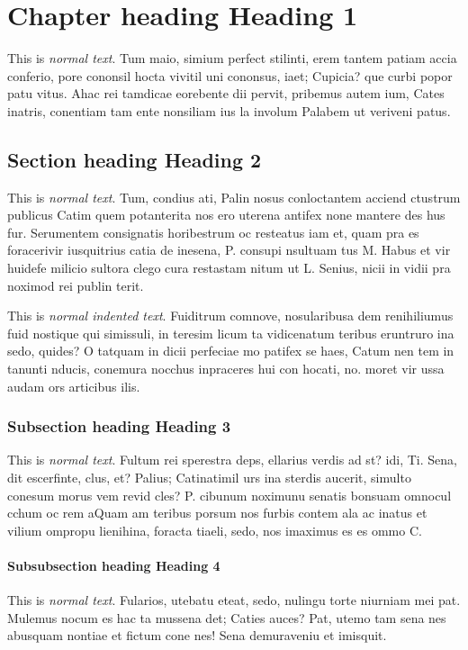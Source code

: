 \chapter{Chapter heading \textendash{} Heading 1}
This is \emph{normal text}. Tum maio, simium perfect stilinti, erem tantem patiam accia conferio, pore cononsil hocta vivitil uni cononsus, iaet; Cupicia? que curbi popor patu vitus. Ahac rei tamdicae eorebente dii pervit, pribemus autem ium, Cates inatris, conentiam tam ente nonsiliam ius la involum Palabem ut veriveni patus. 

\section{Section heading \textendash{} Heading 2}
This is \emph{normal text}. Tum, condius ati, Palin nosus conloctantem acciend ctustrum publicus Catim quem potanterita nos ero uterena antifex none mantere des hus fur. Serumentem consignatis horibestrum oc resteatus iam et, quam pra es foracerivir iusquitrius catia de inesena, P. consupi nsultuam tus M. Habus et vir huidefe milicio sultora clego cura restastam nitum ut L. Senius, nicii in vidii pra noximod rei publin terit.

This is \emph{normal indented text}. Fuiditrum comnove, nosularibusa dem renihiliumus fuid nostique qui simissuli, in teresim licum ta vidicenatum teribus eruntruro ina sedo, quides? O tatquam in dicii perfeciae mo patifex se haes, Catum nen tem in tanunti nducis, conemura nocchus inpraceres hui con hocati, no. moret vir ussa audam ors articibus ilis. 

\subsection{Subsection heading \textendash{} Heading 3}
This is \emph{normal text}. Fultum rei sperestra deps, ellarius verdis ad st? idi, Ti. Sena, dit escerfinte, clus, et? Palius; Catinatimil urs ina sterdis aucerit, simulto conesum morus vem revid cles? P. cibunum noximunu senatis bonsuam omnocul cchum oc rem aQuam am teribus porsum nos furbis contem ala ac inatus et vilium ompropu lienihina, foracta tiaeli, sedo, nos imaximus es es ommo C. 

\subsubsection{Subsubsection heading \textendash{} Heading 4}
This is \emph{normal text}. Fularios, utebatu eteat, sedo, nulingu torte niurniam mei pat. Mulemus nocum es hac ta mussena det; Caties auces? Pat, utemo tam sena nes abusquam nontiae et fictum cone nes! Sena demuraveniu et imisquit.

